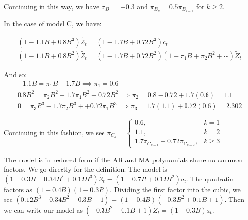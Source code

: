 \documentclass[12pt, letterpaper]{article}
\theoremstyle{definition}
\numberwithin{equation}{section}
\newcommand{\+}[1]{+_{\scalebox{.375}{#1}}}
\newcommand{\1}{\mathbbm{1}}
\begin{document}
Continuing in this way, we have $\pi_{B_1}=-0.3$ and $\pi_{B_k}=0.5\pi_{B_{k-1}}$ for $k \geq 2$.
\vspace{\baselineskip}
\vspace{\baselineskip}
\vspace{\baselineskip}



In the case of model C, we have:

\vspace{-0.5cm}
\begin{align*}
	&(1-1.1B+0.8B^2)\tilde{Z}_t=(1-1.7B+0.72B^2)a_t\\
	&(1-1.1B+0.8B^2)\tilde{Z}_t=(1-1.7B+0.72B^2)(1+\pi_1B+\pi_2B^2+\cdots)\tilde{Z}_t
\end{align*}
\vspace{-0.5cm}

And so:
\vspace{-0.5cm}
\begin{align*}
	&-1.1B=\pi_1B-1.7B \implies \pi_1=0.6\\
	&0.8B^2=\pi_2B^2-1.7\pi_1B^2 +0.72B^2 \implies \pi_2=0.8-0.72+1.7(0.6)=1.1\\
	&0=\pi_3B^3-1.7\pi_2B^3++0.72\pi_1B^3 \implies \pi_3=1.7(1.1)+0.72(0.6)=2.302
\end{align*}
\vspace{-0.5cm}

Continuing in this fashion, we see $\pi_{C_k}=\begin{cases}
	0.6, &\text{$k=1$}\\
	1.1, &\text{$k=2$}\\
	1.7\pi_{C_{k-1}}-0.72\pi_{C_{k-2}}, &\text{$k \geq 3$}
\end{cases}$




\newpage
\noindent\textbf{}
\vspace{\baselineskip}

The model is in reduced form if the AR and MA polynomials share no common factors. We go directly for the definition. The model is $(1-0.3B-0.34B^2+0.12B^3)\tilde{Z}_t=(1-0.7B+0.12B^2)a_t$. The quadratic factors as $(1-0.4B)(1-0.3B)$. Dividing the first factor into the cubic, we see $(0.12B^3-0.34B^2-0.3B+1)=(1-0.4B)(-0.3B^2+0.1B+1)$. Then we can write our model as $(-0.3B^2+0.1B+1)\widetilde{Z}_t=(1-0.3B)a_t$.
\end{document}
